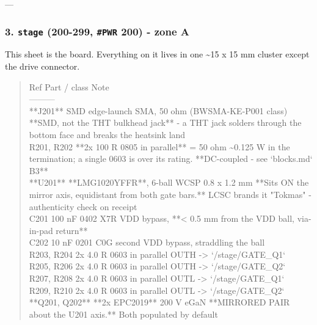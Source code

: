\documentclass[11pt,a4paper]{article}
\begin{document}
---

\subsubsection*{3. \texttt{stage} (200-299, \texttt{\#PWR} 200) - zone A}
This sheet is the board. Everything on it lives in one \textasciitilde{}15 x 15 mm cluster except the drive connector.

\begin{quote}\small\ttfamily\raggedright
\textbar{} Ref \textbar{} Part / class \textbar{} Note \textbar{}\\
\textbar{}---\textbar{}---\textbar{}---\textbar{}\\
\textbar{} {*}{*}J201{*}{*} \textbar{} SMD edge-launch SMA, 50 ohm (BWSMA-KE-P001 class) \textbar{} {*}{*}SMD, not the THT bulkhead jack{*}{*} - a THT jack solders through the bottom face and breaks the heatsink land \textbar{}\\
\textbar{} R201, R202 \textbar{} {*}{*}2x 100 R 0805 in parallel{*}{*} = 50 ohm \textbar{} \textasciitilde{}0.125 W in the termination; a single 0603 is over its rating. {*}{*}DC-coupled - see `blocks.md` B3{*}{*} \textbar{}\\
\textbar{} {*}{*}U201{*}{*} \textbar{} {*}{*}LMG1020YFFR{*}{*}, 6-ball WCSP 0.8 x 1.2 mm \textbar{} {*}{*}Sits ON the mirror axis, equidistant from both gate bars.{*}{*} LCSC brands it "Tokmas" - authenticity check on receipt \textbar{}\\
\textbar{} C201 \textbar{} 100 nF 0402 X7R \textbar{} VDD bypass, {*}{*}\textless{} 0.5 mm from the VDD ball, via-in-pad return{*}{*} \textbar{}\\
\textbar{} C202 \textbar{} 10 nF 0201 C0G \textbar{} second VDD bypass, straddling the ball \textbar{}\\
\textbar{} R203, R204 \textbar{} 2x 4.0 R 0603 in parallel \textbar{} OUTH -\textgreater{} `/stage/GATE\_Q1` \textbar{}\\
\textbar{} R205, R206 \textbar{} 2x 4.0 R 0603 in parallel \textbar{} OUTH -\textgreater{} `/stage/GATE\_Q2` \textbar{}\\
\textbar{} R207, R208 \textbar{} 2x 4.0 R 0603 in parallel \textbar{} OUTL -\textgreater{} `/stage/GATE\_Q1` \textbar{}\\
\textbar{} R209, R210 \textbar{} 2x 4.0 R 0603 in parallel \textbar{} OUTL -\textgreater{} `/stage/GATE\_Q2` \textbar{}\\
\textbar{} {*}{*}Q201, Q202{*}{*} \textbar{} {*}{*}2x EPC2019{*}{*} 200 V eGaN \textbar{} {*}{*}MIRRORED PAIR about the U201 axis.{*}{*} Both populated by default \textbar{}\\

\end{quote}
\end{document}
